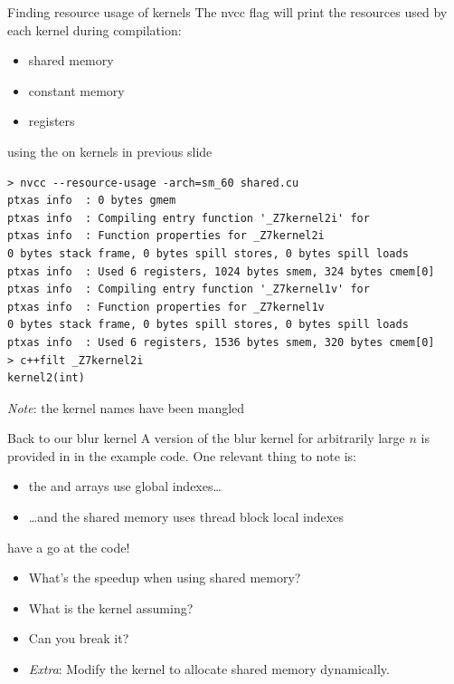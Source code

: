 \documentclass[aspectratio=43]{beamer}
\begin{document}
\begin{frame}[fragile]{Finding resource usage of kernels}
    The nvcc flag  will print the resources used by each kernel during compilation:
    \begin{itemize}
        \item shared memory
        \item constant memory
        \item registers
    \end{itemize}

    \begin{terminal}{using the  on kernels in previous slide}
    \begin{lstlisting}[style=terminal]
> nvcc --resource-usage -arch=sm_60 shared.cu 
ptxas info  : 0 bytes gmem
ptxas info  : Compiling entry function '_Z7kernel2i' for
ptxas info  : Function properties for _Z7kernel2i
0 bytes stack frame, 0 bytes spill stores, 0 bytes spill loads
ptxas info  : Used 6 registers, 1024 bytes smem, 324 bytes cmem[0]
ptxas info  : Compiling entry function '_Z7kernel1v' for
ptxas info  : Function properties for _Z7kernel1v
0 bytes stack frame, 0 bytes spill stores, 0 bytes spill loads
ptxas info  : Used 6 registers, 1536 bytes smem, 320 bytes cmem[0]
> c++filt _Z7kernel2i
kernel2(int)
    \end{lstlisting}
    \end{terminal}
    \emph{Note}: the kernel names have been mangled

\end{frame}

\begin{frame}[fragile]{Back to our blur kernel}
        A version of the blur kernel for arbitrarily large $n$ is provided in  in the example code. One relevant thing to note is:
        \begin{itemize}
            \item  the  and  arrays use global indexes\dots
            \item  \dots and the shared memory uses thread block local indexes
        \end{itemize}

    \begin{info}{have a go at the code!}
        \begin{itemize}
            \item What's the speedup when using shared memory?
            \item What is the  kernel assuming?
            \item Can you break it?
            \item \emph{Extra}: Modify the  kernel to allocate shared memory dynamically.
        \end{itemize}
    \end{info}

\end{frame}
\end{document}
